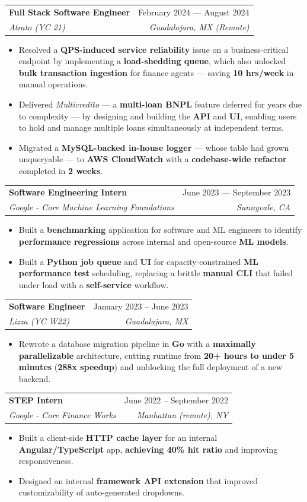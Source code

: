\documentclass[letterpaper,11pt]{article}
\makeatletter
\newcommand{\resumeItem}[1]{
  \item\small{
    {#1 \vspace{-2pt}}
  }
}
\newcommand{\resumeSubheading}[4]{
  \vspace{-2pt}\item
    \begin{tabular*}{0.97\textwidth}[t]{l@{\extracolsep{\fill}}r}
      \textbf{#1} & #2 \\
      \textit{\small#3} & \textit{\small #4} \\
    \end{tabular*}\vspace{-7pt}
}
\newcommand{\resumeItemListStart}{\begin{itemize}}
\newcommand{\resumeItemListEnd}{\end{itemize}\vspace{-5pt}}
\makeatother
\begin{document}
  \resumeSubheading
      {Full Stack Software Engineer}{February 2024 --- August 2024}
      {Atrato (YC 21)}{Guadalajara, MX (Remote)}
      \resumeItemListStart
        \resumeItem{Resolved a \textbf{QPS-induced service reliability} issue on a business-critical endpoint by implementing a \textbf{load-shedding queue}, which also unlocked \textbf{bulk transaction ingestion} for finance agents — saving \textbf{10 hrs/week} in manual operations.}
        \resumeItem{Delivered \textit{Multicredito} — a \textbf{multi-loan BNPL} feature deferred for years due to complexity — by designing and building the \textbf{API} and \textbf{UI}, enabling users to hold and manage multiple loans simultaneously at independent terms.}
        \resumeItem{Migrated a \textbf{MySQL-backed in-house logger} — whose table had grown unqueryable — to \textbf{AWS CloudWatch} with a \textbf{codebase-wide refactor} completed in \textbf{2 weeks}.}
      \resumeItemListEnd

    \resumeSubheading
      {Software Engineering Intern}{June 2023 --- September 2023}
      {Google - Core Machine Learning Foundations}{Sunnyvale, CA}
      \resumeItemListStart
        \resumeItem{Built a \textbf{benchmarking} application for software and ML engineers to identify \textbf{performance regressions} across internal and open-source \textbf{ML models}.}
        \resumeItem{Built a \textbf{Python job queue} and \textbf{UI} for capacity-constrained \textbf{ML performance test} scheduling, replacing a brittle \textbf{manual CLI} that failed under load with a \textbf{self-service} workflow.}
      \resumeItemListEnd

    \resumeSubheading
      {Software Engineer}{January 2023 -- June 2023}
      {Lizza (YC W22)}{Guadalajara, MX}
      \resumeItemListStart
        \resumeItem{Rewrote a database migration pipeline in \textbf{Go} with a \textbf{maximally parallelizable} architecture, cutting runtime from \textbf{20+ hours to under 5 minutes} (\textbf{288x speedup}) and unblocking the full deployment of a new backend.}
    \resumeItemListEnd

    \resumeSubheading
      {STEP Intern}{June 2022 -- September 2022}
      {Google - Core Finance Works}{Manhattan (remote), NY}
    \resumeItemListStart
        \resumeItem{Built a client-side \textbf{HTTP cache layer} for an internal \textbf{Angular/TypeScript} app, \textbf{achieving 40\% hit ratio} and improving responsiveness.}
        \resumeItem{Designed an internal \textbf{framework API extension} that improved customizability of auto-generated dropdowns.}
      \resumeItemListEnd
\end{document}
